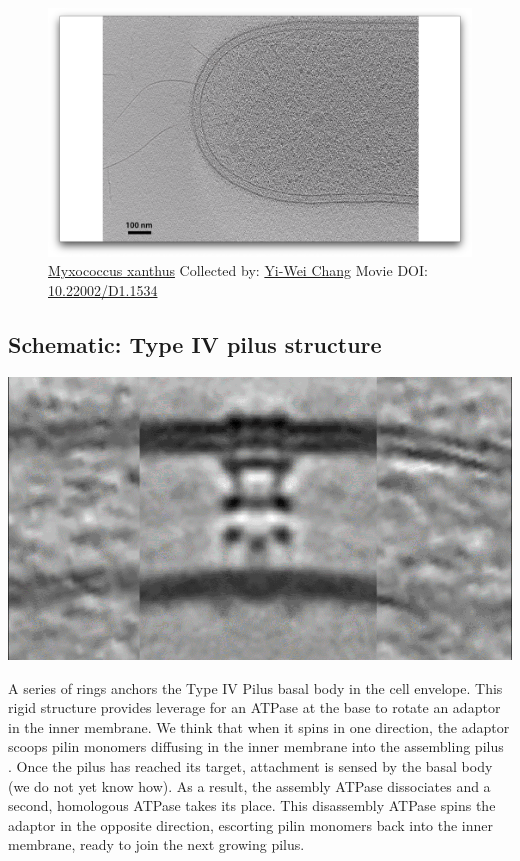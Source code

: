 \documentclass[]{tufte-book}
\begin{document}
\begin{figure}
\includegraphics{movie_stills/6_10} \caption[\protect\hyperlink{tree}{Myxococcus xanthus} Collected by:
\protect\hyperlink{yi-wei_chang}{Yi-Wei Chang} Movie DOI:
\href{https://doi.org/10.22002/D1.1534}{10.22002/D1.1534}]{\protect\hyperlink{tree}{Myxococcus xanthus} Collected by:
\protect\hyperlink{yi-wei_chang}{Yi-Wei Chang} Movie DOI:
\href{https://doi.org/10.22002/D1.1534}{10.22002/D1.1534}}\label{fig:6-10}
\end{figure}

\hypertarget{Type_IV_pilus_structure}{\subsection*{Schematic: Type IV
pilus structure}\label{Type_IV_pilus_structure}}

\includegraphics{img/schematics/6_10_1}

A series of rings anchors the Type IV Pilus basal body in the cell
envelope. This rigid structure provides leverage for an ATPase at the
base to rotate an adaptor in the inner membrane. We think that when it
spins in one direction, the adaptor scoops pilin monomers diffusing in
the inner membrane into the assembling pilus \citep{chang2016}. Once the
pilus has reached its target, attachment is sensed by the basal body (we
do not yet know how). As a result, the assembly ATPase dissociates and a
second, homologous ATPase takes its place. This disassembly ATPase spins
the adaptor in the opposite direction, escorting pilin monomers back
into the inner membrane, ready to join the next growing pilus.
\end{document}
